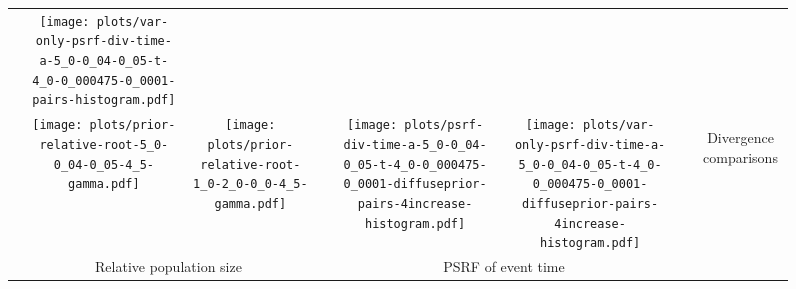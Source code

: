\documentclass[border=10pt,varwidth=30cm]{standalone}
\begin{document}
\begin{figure}
\begin{tabular}{@{}cccccccc@{}}
        & \texttt{[image: plots/var-only-psrf-div-time-a-5\_0-0\_04-0\_05-t-4\_0-0\_000475-0\_0001-pairs-histogram.pdf]}
        & \multicolumn{1}{c|}{}
        & \\
        & \texttt{[image: plots/prior-relative-root-5\_0-0\_04-0\_05-4\_5-gamma.pdf]}
        & \texttt{[image: plots/prior-relative-root-1\_0-2\_0-0\_0-4\_5-gamma.pdf]}
        &
        & \texttt{[image: plots/psrf-div-time-a-5\_0-0\_04-0\_05-t-4\_0-0\_000475-0\_0001-diffuseprior-pairs-4increase-histogram.pdf]}
        & \texttt{[image: plots/var-only-psrf-div-time-a-5\_0-0\_04-0\_05-t-4\_0-0\_000475-0\_0001-diffuseprior-pairs-4increase-histogram.pdf]}
        & \multicolumn{1}{c|}{}
        & \multirow{5}{*}[16.5em]{\begin{sideways}\Large Divergence comparisons\end{sideways}} \\
        & \multicolumn{2}{c}{\large Relative population size}
        &
        & \multicolumn{2}{c}{\large PSRF of event time}
        &
        & \\
    \end{tabular}
\end{figure}
\end{document}
